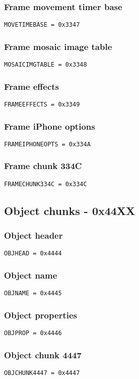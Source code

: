 \documentclass{article}
\begin{document}
\subsubsection{Frame movement timer base}
\verb|MOVETIMEBASE = 0x3347|

\subsubsection{Frame mosaic image table}
\verb|MOSAICIMGTABLE = 0x3348|

\subsubsection{Frame effects}
\verb|FRAMEEFFECTS = 0x3349|

\subsubsection{Frame iPhone options}
\verb|FRAMEIPHONEOPTS = 0x334A|

\subsubsection{Frame chunk 334C}
\verb|FRAMECHUNK334C = 0x334C|

\subsection{Object chunks - 0x44XX}

\subsubsection{Object header}
\verb|OBJHEAD = 0x4444|

\subsubsection{Object name}
\verb|OBJNAME = 0x4445|

\subsubsection{Object properties}
\verb|OBJPROP = 0x4446|

\subsubsection{Object chunk 4447}
\verb|OBJCHUNK4447 = 0x4447|
\end{document}
